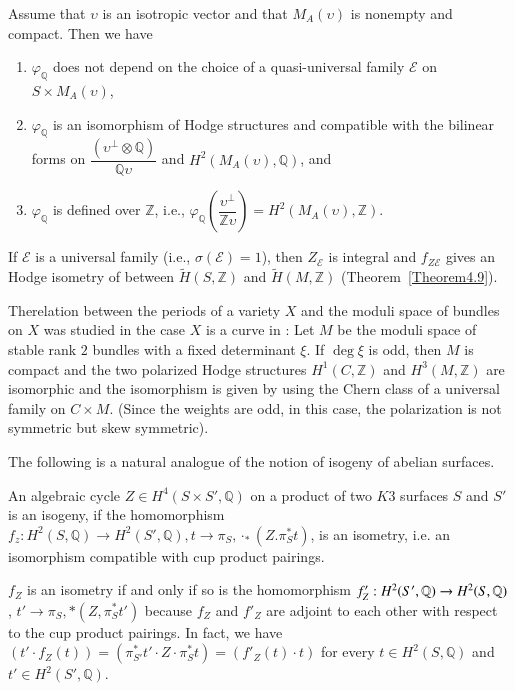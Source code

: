 \begin{Theorem}\label{Theorem1.5}
Assume that $\upsilon$ is an isotropic vector and that $M_A(\upsilon)$
is nonempty and compact. Then we have 
\begin{enumerate}
\renewcommand{\labelenumi}{(\theenumi)}
\item $\varphi_{\mathbb{Q}}$ does not depend on the choice of a
  quasi-universal family $\mathscr{E}$ on $S\times M_A(\upsilon)$, 
\item $\varphi_{\mathbb{Q}}$ is an isomorphism of Hodge structures and
  compatible with the bilinear forms on
  $\dfrac{(\upsilon^{\perp}\otimes \mathbb{Q})}{\mathbb{Q}\upsilon}$
  and $H^{2}(M_A(\upsilon),\mathbb{Q})$, and 
\item $\varphi_{\mathbb{Q}}$ is defined over $\mathbb{Z}$, i.e.,
  $\varphi_{\mathbb{Q}}\left(\dfrac{\upsilon^{\perp}}{\mathbb{Z}\upsilon}\right)=H^{2}(M_A(\upsilon),
  \mathbb{Z})$. 
\end{enumerate}
\end{Theorem}

If $\mathscr{E}$ is a universal family (i.e.,
$\sigma(\mathscr{E})=1$), then $Z_{\mathscr{E}}$ is integral and
$f_{Z\mathscr{E}}$ gives an Hodge isometry of between
$\widetilde{H}(S,\mathbb{Z})$ and $\widetilde{H}(M,\mathbb{Z})$ (Theorem~\ref{Theorem4.9}).

\begin{remark}\label{remark1.6}
The\pageoriginale relation between the periods of a variety $X$ and the moduli space
of bundles on $X$ was studied in the case $X$ is a curve in
\cite{key16}: Let $M$ be the moduli space of stable rank $2$ bundles
with a fixed determinant $\xi$. If $\deg \xi$ is odd, then $M$ is
compact and the two polarized Hodge structures $H^{1}(C,\mathbb{Z})$
and $H^{3}(M,\mathbb{Z})$ are isomorphic and the isomorphism is given
by using the Chern class of a universal family on $C\times M$. (Since
the weights are odd, in this case, the polarization is not symmetric
but skew symmetric).

The following is a natural analogue of the notion of isogeny of
abelian surfaces.
\end{remark}

\begin{dfn}\label{dfn1.7}
An algebraic cycle $Z\in H^{4}(S\times S',\mathbb{Q})$ on a product of
two $K3$ surfaces $S$ and $S'$ is an isogeny, if the homomorphism
$f_z:H^{2}(S,\mathbb{Q})\to H^{2}(S',\mathbb{Q}),t\to
\pi_{S},\cdot_{\ast}(Z.\pi^{\ast}_St)$, is an isometry, i.e. an
isomorphism compatible with cup product pairings. 

$f_Z$ is an isometry if and only if so is the homomorphism
$f'_Z:H^{2}\\(S',\mathbb{Q})\to H^{2}(S,\mathbb{Q})$, $t'\to
\pi_{S},\ast(Z,\pi^{\ast}_St')$ because $f_Z$ and $f'_Z$ are adjoint to
each other with respect to the cup product pairings. In fact, we have
$(t'\cdot f_Z(t))=(\pi_{S'}^{\ast}t'\cdot Z\cdot
\pi^{\ast}_St)=(f'_Z(t)\cdot t)$ for every $t\in H^{2}(S,\mathbb{Q})$
and $t'\in H^{2}(S',\mathbb{Q})$.
\end{dfn}

